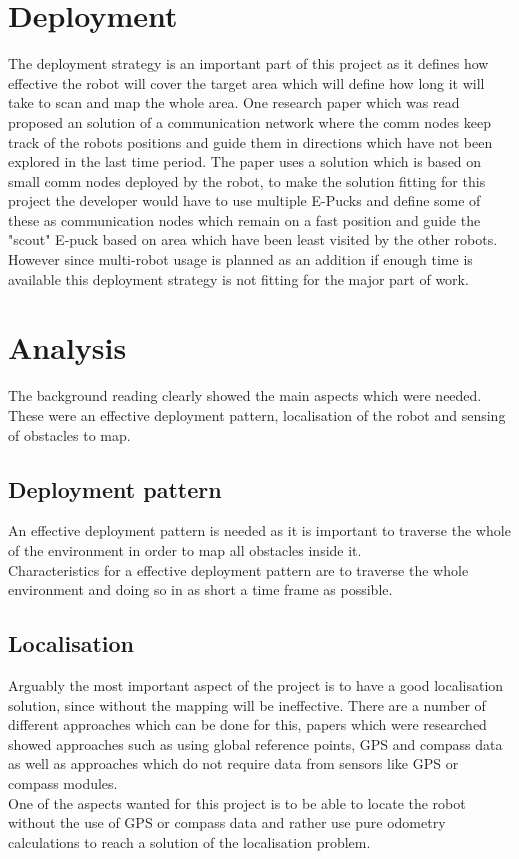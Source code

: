 \section{Deployment}
The deployment strategy is an important part of this project as it defines how effective the robot will cover the target area which will define how long it will take to scan and map the whole area. 
One research paper which was read proposed an solution of a communication network where the comm nodes keep track of the robots positions and guide them in directions which have not been explored in the last time period\cite{Batalin2003Coverage}. The paper uses a solution which is based on small comm nodes deployed by the robot, to make the solution fitting for this project the developer would have to use multiple E-Pucks and define some of these as communication nodes which remain on a fast position and guide the "scout" E-puck based on area which have been least visited by the other robots.\\ 
However since multi-robot usage is planned as an addition if enough time is available this deployment strategy is not fitting for the major part of work.\\[3ex]

\section{Analysis}
The background reading clearly showed the main aspects which were needed.\\
These were an effective deployment pattern, localisation of the robot and sensing of obstacles to map. 

\subsection{Deployment pattern}
An effective deployment pattern is needed as it is important to traverse the whole of the environment in order to map all obstacles inside it.\\
Characteristics for a effective deployment pattern are to traverse the whole environment and doing so in as short a time frame as possible.

\subsection{Localisation}
Arguably the most important aspect of the project is to have a good localisation solution, since without the mapping will be ineffective. There are a number of different approaches which can be done for this, papers which were researched showed approaches such as using global reference points, GPS and compass data as well as approaches which do not require data from sensors like GPS or compass modules.\\
One of the aspects wanted for this project is to be able to locate the robot without the use of GPS or compass data and rather use pure odometry calculations to reach a solution of the localisation problem.

